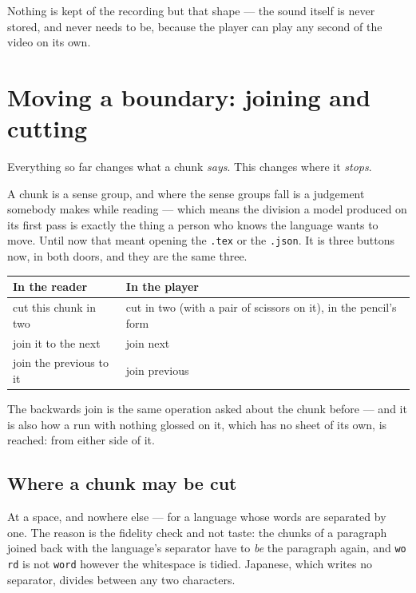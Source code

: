 \documentclass[11pt,oneside]{report}
\newcommand{\file}[1]{\texttt{#1}}
\newcommand{\menu}[1]{\textsf{#1}}
\begin{document}
\noindent Nothing is kept of the recording but that shape --- the sound
itself is never stored, and never needs to be, because the player can play
any second of the video on its own.

\section{Moving a boundary: joining and cutting}
\label{sec:divide}

Everything so far changes what a chunk \emph{says}. This changes where it
\emph{stops}.

A chunk is a sense group, and where the sense groups fall is a judgement
somebody makes while reading --- which means the division a model produced on
its first pass is exactly the thing a person who knows the language wants to
move. Until now that meant opening the \file{.tex} or the \file{.json}. It is
three buttons now, in both doors, and they are the same three.

\begin{center}
\begin{tabular}{@{}p{}p{}@{}}
\toprule
\textsf{In the reader} & \textsf{In the player} \\
\midrule
\menu{cut this chunk in two} & \menu{cut in two} (with a pair of scissors on
it), in the pencil's form \\
\menu{join it to the next} & \menu{join next} \\
\menu{join the previous to it} & \menu{join previous} \\
\bottomrule
\end{tabular}
\end{center}

\noindent The backwards join is the same operation asked about the chunk
before --- and it is also how a run with nothing glossed on it, which has no
sheet of its own, is reached: from either side of it.

\subsection*{Where a chunk may be cut}

At a space, and nowhere else --- for a language whose words are separated by
one. The reason is the fidelity check and not taste: the chunks of a paragraph
joined back with the language's separator have to \emph{be} the paragraph
again, and \texttt{wo rd} is not \texttt{word} however the whitespace is
tidied. Japanese, which writes no separator, divides between any two
characters.
\end{document}
